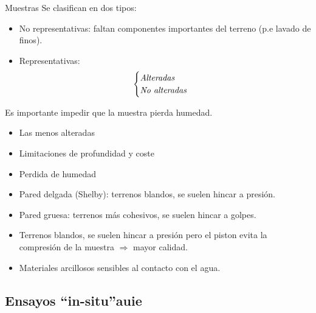 \begin{mybox}{Muestras}
	Se clasifican en dos tipos:
	\begin{itemize}
		\item No representativas: faltan componentes importantes del terreno (p.e lavado de finos).
		\item Representativas:
			\begin{equation}
					\begin{cases}
						\emph{Alteradas}\\
						\emph{No alteradas}
					\end{cases}\notag
			\end{equation}
	\end{itemize}
	\begin{myrem}[Humedad]
		Es importante impedir que la muestra pierda humedad.
	\end{myrem}
		\begin{itemize}
			\item Las menos alteradas
			\item Limitaciones de profundidad y coste
			\item Perdida de humedad
		\end{itemize}
		\begin{itemize}
			\item Pared delgada (Shelby): terrenos blandos, se suelen hincar a presión.
			\item Pared gruesa: terrenos más cohesivos, se suelen hincar a golpes.
		\end{itemize}
		\begin{itemize}
			\item Terrenos blandos, se suelen hincar a presión pero el piston evita la compresión de la muestra $\Rightarrow$ mayor calidad.
		\end{itemize}
		\begin{itemize}
			\item Materiales arcillosos sensibles al contacto con el agua.
		\end{itemize}
\end{mybox}

\subsection{Ensayos ``in-situ''auie} %
\label{sub:ensayos_}

